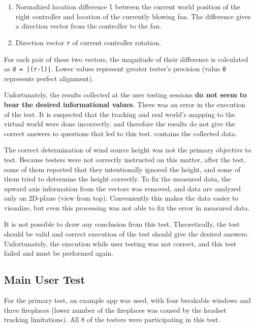\begin{enumerate}

\item{Normalized location difference \texttt{l} between the current world position of the right
controller and location of the currently blowing fan. The difference gives a direction
vector from the controller to the fan.}

\item{Direction vector \texttt{r} of current controller rotation.}

\end{enumerate}


For each pair of these two vectors, the magnitude of their difference is calculated
as \texttt{d = |(r-l)|}.
Lower values represent greater tester’s precision (value \texttt{0} represents
perfect alignment).



Unfortunately, the results collected at the user testing sessions
\textbf{do not seem to bear the desired informational values}.
There was an error in the execution of the test. It is suspected that
the tracking and real world’s mapping to the virtual world were done
incorrectly, and therefore the results do not give the correct answers to
questions that led to this test. \hyperlink{15-attachments#att2}{}
contains the collected data.


The correct determination of wind source height was not the primary
objective to test. Because testers were not correctly instructed on this matter,
after the test, some of them reported that they intentionally ignored the
height, and some of them tried to determine the height correctly.
To fix the measured data, the upward axis information from the vectors was
removed, and data are analyzed only on 2D-plane (view from top).
Conveniently this makes the data easier to visualize, but even this
processing was not able to fix the error in measured data.


It is not possible to draw any conclusion from this test. Theoretically, the
test should be valid and correct execution of the test should give the
desired answers. Unfortunately, the execution while user testing was not
correct, and this test failed and must be performed again.


\hypertarget{x-main-user-test}{\subsection*{Main User Test}}
For the primary test, an example app was used, with four breakable windows
and three fireplaces (lower number of the fireplaces was caused by
the headset tracking limitations). All 8 of the testers were participating
in this test.


